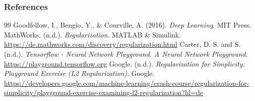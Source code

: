 \documentclass[11pt,compress,t,notes=noshow, xcolor=table]{beamer}
\begin{document}
\begin{vbframe}
\frametitle{References}
\footnotesize{
\begin{thebibliography}{99}
Goodfellow, I., Bengio, Y., \& Courville, A. (2016). \textit{Deep Learning}. MIT Press. 
MathWorks. (n.d.). \textit{Regularization}. MATLAB \& Simulink. \url{https://de.mathworks.com/discovery/regularization.html}
Carter, D. S. and S. (n.d.). \textit{Tensorflow - Neural Network Playground. A Neural Network Playground}. \url{https://playground.tensorflow.org} 
 Google. (n.d.). \textit{Regularization for Simplicity: Playground Exercise (L2 Regularization)}. Google. \url{https://developers.google.com/machine-learning/crash-course/regularization-for-simplicity/playground-exercise-examining-l2-regularization?hl=de} 
\end{thebibliography}
}
\end{vbframe}

\endlecture
\end{document}
